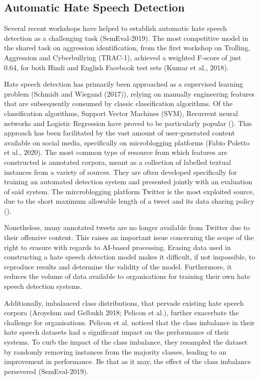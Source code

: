 \documentclass[letterpaper]{article} %
\begin{document}
\subsection{Automatic Hate Speech Detection}

Several recent workshops have helped to establish automatic hate speech detection as a challenging task (SemEval-2019). The most competitive model in the shared task on aggression identification, from the first workshop on Trolling, Aggression and Cyberbullying (TRAC-1), achieved a weighted F-score of just 0.64, for both Hindi and English Facebook test sets (Kumar et al., 2018). \par

Hate speech detection has primarily been approached as a supervised learning problem (Schmidt and Wiegand (2017)), relying on manually engineering features that are subsequently consumed by classic classification algorithms. Of the classification algorithms, Support Vector Machines (SVM), Recurrent neural networks and Logistic Regression have proved to be particularly popular (). This approach has been facilitated by the vast amount of user-generated content available on social media, specifically on microblogging platforms (Fabio Poletto et al., 2020). The most common type of resource from which features are constructed is annotated corpora, meant as a collection of labelled textual instances from a variety of sources. They are often developed specifically for training an automated detection system and presented jointly with an evaluation of said system. The mircroblogging platform Twitter is the most exploited source, due to the short maximum allowable length of a tweet and its data sharing policy (). \par
Nonetheless, many annotated tweets are no longer available from Twitter due to their offensive content. This raises an important issue concerning the scope of the right to erasure with regards to AI-based processing. Erasing data used in constructing a hate speech detection model makes it difficult, if not impossible, to reproduce results and determine the validity of the model. Furthermore, it reduces the volume of data available to organisations for training their own hate speech detection systems. \par
Additionally, imbalanced class distributions, that pervade existing hate speech corpora (Aroyehun and Gelbukh 2018; Pelicon et al.), further exacerbate the challenge for organisations. Pelicon et al. noticed that the class imbalance in their hate speech datasets had a significant impact on the performance of their systems. To curb the impact of the class imbalance, they resampled the dataset by randomly removing instances from the majority classes, leading to an improvement in performance. Be that as it may, the effect of the class imbalance persevered (SemEval-2019).
\end{document}
